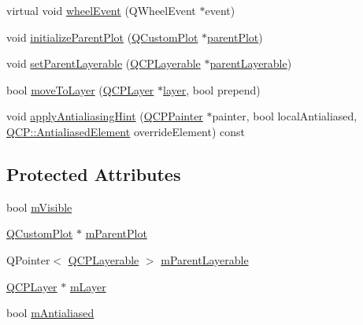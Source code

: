 \begin{DoxyCompactItemize}
\item 
virtual void \hyperlink{class_q_c_p_layerable_a47dfd7b8fd99c08ca54e09c362b6f022}{wheel\+Event} (Q\+Wheel\+Event $\ast$event)
\item 
void \hyperlink{class_q_c_p_layerable_a8cbe5a0c9a5674249982f5ca5f8e02bc}{initialize\+Parent\+Plot} (\hyperlink{class_q_custom_plot}{Q\+Custom\+Plot} $\ast$\hyperlink{class_q_c_p_layerable_a473edb813a4c1929d6b6a8fe3ff3faf7}{parent\+Plot})
\item 
void \hyperlink{class_q_c_p_layerable_aa23c893671f1f6744ac235cf2204cf3a}{set\+Parent\+Layerable} (\hyperlink{class_q_c_p_layerable}{Q\+C\+P\+Layerable} $\ast$\hyperlink{class_q_c_p_layerable_aa78b7e644d2c519e1a9a6f2ac5fcd858}{parent\+Layerable})
\item 
bool \hyperlink{class_q_c_p_layerable_af94484cfb7cbbddb7de522e9be71d9a4}{move\+To\+Layer} (\hyperlink{class_q_c_p_layer}{Q\+C\+P\+Layer} $\ast$\hyperlink{class_q_c_p_layerable_a5ff4862e8c784c9f5986dbc1533ba2a4}{layer}, bool prepend)
\item 
void \hyperlink{class_q_c_p_layerable_acb663e375d2d36dc5c55021ee5a2119b}{apply\+Antialiasing\+Hint} (\hyperlink{class_q_c_p_painter}{Q\+C\+P\+Painter} $\ast$painter, bool local\+Antialiased, \hyperlink{namespace_q_c_p_ae55dbe315d41fe80f29ba88100843a0c}{Q\+C\+P\+::\+Antialiased\+Element} override\+Element) const
\end{DoxyCompactItemize}
\subsection*{Protected Attributes}
\begin{DoxyCompactItemize}
\item 
bool \hyperlink{class_q_c_p_layerable_a62e3aed8427d6ce3ccf716f285106cb3}{m\+Visible}
\item 
\hyperlink{class_q_custom_plot}{Q\+Custom\+Plot} $\ast$ \hyperlink{class_q_c_p_layerable_aa2a528433e44db02b8aef23c1f9f90ed}{m\+Parent\+Plot}
\item 
Q\+Pointer$<$ \hyperlink{class_q_c_p_layerable}{Q\+C\+P\+Layerable} $>$ \hyperlink{class_q_c_p_layerable_a3291445a980053e2d17a21d15957624e}{m\+Parent\+Layerable}
\item 
\hyperlink{class_q_c_p_layer}{Q\+C\+P\+Layer} $\ast$ \hyperlink{class_q_c_p_layerable_aa38ec5891aff0f50b36fd63e9372a0cd}{m\+Layer}
\item 
bool \hyperlink{class_q_c_p_layerable_a3ab45a4c76a3333ce42eb217a81733ec}{m\+Antialiased}
\end{DoxyCompactItemize}

